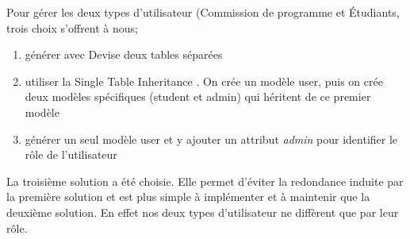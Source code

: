 Pour gérer les deux types d'utilisateur (Commission de programme et Étudiants, trois choix s'offrent à nous;
\begin{enumerate}
  \item générer avec Devise deux tables séparées
  \item utiliser la Single Table Inheritance \cite{STI}. On crée un modèle user, puis on crée deux modèles spécifiques (student et admin) qui héritent de ce premier modèle
  \item générer un seul modèle user et y ajouter un attribut \textit{admin} pour identifier le rôle de l'utilisateur
\end{enumerate}

La troisième solution a été choisie. Elle permet d'éviter la redondance induite par la première solution et est plus simple à implémenter et à maintenir que la deuxième solution. En effet nos deux types d'utilisateur ne diffèrent que par leur rôle. 









